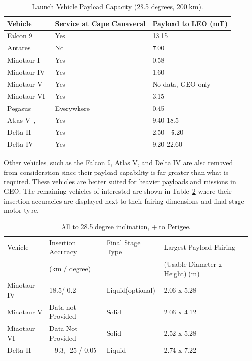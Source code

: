 \documentclass[paper=letter, fontsize=11pt]{scrartcl} %
\numberwithin{equation}{section} %
\numberwithin{figure}{section} %
\numberwithin{table}{section} %
\begin{document}
\begin{table}[H]
\centering
\begin{tabular}{l l l}
\toprule
Vehicle &  Service at Cape Canaveral & Payload to LEO (mT) \\
\midrule
Falcon 9~\cite{ref12_1} & Yes & 13.15 \\
Antares~\cite{ref12_2} & No & 7.00 \\
Minotaur I~\cite{ref12_3} & Yes & 0.58 \\
Minotaur IV~\cite{ref12_4} & Yes & 1.60 \\
Minotaur V & Yes & No data, GEO only \\
Minotaur VI~\cite{ref12_5} & Yes & 3.15 \\
Pegasus~\cite{ref12_6} & Everywhere & 0.45 \\
Atlas V~\cite{ref12_7}, \cite{ref12_8} & Yes & 9.40-18.5 \\
Delta II~\cite{ref12_9} & Yes & 2.50---6.20 \\
Delta IV~\cite{ref12_10} & Yes & 9.20-22.60 \\
\bottomrule
\end{tabular}
\caption{Launch Vehicle Payload Capacity (28.5 degrees, 200 km).}
\label{table:potential_payload_capacity}
\end{table}

Other vehicles, such as the Falcon 9, Atlas V, and Delta IV are also removed from consideration since their payload capability is far greater than what is required. These vehicles are better suited for heavier payloads and missions in GEO. The remaining vehicles of interested are shown in Table~\ref{table:final_choices} where their insertion accuracies are displayed next to their fairing dimensions and final stage motor type.

\begin{table}[H]
\centering
\begin{tabular}{l l l l }
\toprule
Vehicle & Insertion Accuracy & Final Stage Type & Largest Payload Fairing\\
	    &      (km / degree) &                  & (Usable Diameter x Height) (m) \\
\midrule
Minotaur IV & 18.5/ 0.2 & Liquid(optional) & 2.06 x 5.28	\\
Minotaur V & Data not Provided & Solid & 2.06 x 4.12	\\
Minotaur VI & Data Not Provided & Solid & 2.52 x 5.28	\\
Delta II & +9.3, -25 / 0.05 & Liquid & 2.74 x 7.22	\\
\bottomrule
\end{tabular}
\caption{All to 28.5 degree inclination, + to Perigee.}
\label{table:final_choices}
\end{table}
\end{document}
